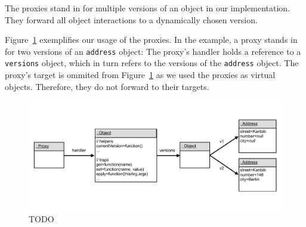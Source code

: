         
    
    



The proxies stand in for multiple versions of an object in our implementation.
They forward all object interactions to a dynamically chosen version.

Figure~\ref{fig:VersioningProxy} exemplifies our usage of the proxies.
In the example, a proxy stands in for two versions of an \lstinline{address} object: The proxy's handler holds a reference to a \lstinline{versions} object, which in turn refers to the versions of the \lstinline{address} object.
The proxy's target is ommited from Figure~\ref{fig:VersioningProxy} as we used the proxies as virtual objects.
Therefore, they do not forward to their targets.

\begin{figure}[h]
    \centering
    \includegraphics[width=\textwidth]{figures/5_implementation/2_versioningProxy.pdf}
    \caption{TODO}
    \label{fig:VersioningProxy}
\end{figure}

